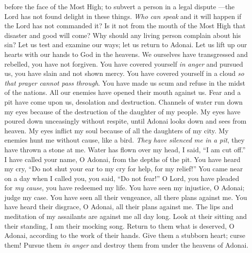 \begin{biblechapter}
before the face of the Most High;
\verse to subvert a person in a legal dispute 
—the Lord has not found delight in these things.
\verse \textit{Who can speak} and it will happen 
if the Lord has not commanded it?
\verse Is it not from the mouth of the Most High 
that disaster and good will come?
\verse Why should any living person complain 
about his sin?
\verse Let us test and examine our ways; 
let us return to Adonai.
\verse Let us lift up our hearts with our hands 
to God in the heavens.
\verse We ourselves have transgressed and rebelled, 
you have not forgiven.
\verse You have covered yourself \textit{in anger} and pursued us, 
you have slain and not shown mercy.
\verse You have covered yourself in a cloud 
\textit{so that prayer cannot pass through}.
\verse You have made us scum and refuse 
in the midst of the nations.
\verse All our enemies 
have opened their mouth against us.
\verse Fear and a pit have come upon us, 
desolation and destruction.
\verse Channels of water run down my eyes 
because of the destruction of the daughter of my people.
\verse My eyes have poured down unceasingly 
without respite,
\verse until Adonai looks down 
and sees from heaven.
\verse My eyes inflict my soul 
because of all the daughters of my city.
\verse My enemies hunt me without cause, 
like a bird.
\verse \textit{They have silenced me in a pit}, 
they have thrown a stone at me.
\verse Water has flown over my head, 
I said, “I am cut off.”
\verse I have called your name, O Adonai, 
from the depths of the pit.
\verse You have heard my cry, “Do not shut your ear 
to my cry for help, for my relief!”
\verse You came near on a day when I called you, 
you said, “Do not fear!”
\verse O Lord, you have pleaded for \textit{my cause}, 
you have redeemed my life.
\verse You have seen my injustice, O Adonai; 
judge my case.
\verse You have seen all their vengeance, 
all there plans against me.
\verse You have heard their disgrace, O Adonai, 
all their plans against me.
\verse The lips and meditation of my assailants 
are against me all day long.
\verse Look at their sitting and their standing, 
I am their mocking song.
\verse Return to them what is deserved, O Adonai, 
according to the work of their hands.
\verse Give them a stubborn heart; 
curse them!
\verse Pursue them \textit{in anger} and destroy them 
from under the heavens of Adonai.
\end{biblechapter}

